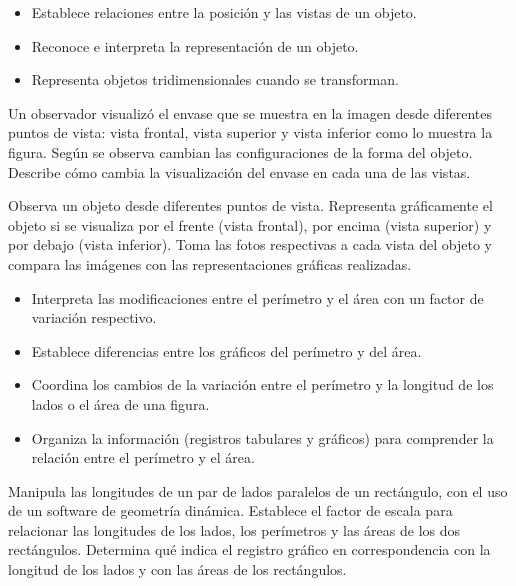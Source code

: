 \evidencias

\begin{itemize}
  \item Establece relaciones entre la posición y las vistas de un objeto.
  \item Reconoce e interpreta la representación de un objeto.
  \item Representa objetos tridimensionales cuando se transforman.
\end{itemize}

\ejemplo

Un observador visualizó el envase que se muestra en la imagen desde diferentes puntos de vista: vista frontal, vista superior y vista inferior como lo muestra la figura. Según se observa cambian las configuraciones de la forma del objeto. Describe cómo cambia la visualización del envase en cada una de las vistas.

Observa un objeto desde diferentes puntos de vista. Representa gráficamente el objeto si se visualiza por el frente (vista frontal), por encima (vista superior) y por debajo (vista inferior). Toma las fotos respectivas a cada vista del objeto y compara las imágenes con las representaciones gráficas realizadas.



\evidencias

\begin{itemize}
  \item Interpreta las modificaciones entre el perímetro y el área con un factor de variación respectivo.
  \item Establece diferencias entre los gráficos del perímetro y del área.
  \item Coordina los cambios de la variación entre el perímetro y la longitud de los lados o el área de una figura.
  \item Organiza la información (registros tabulares y gráficos) para comprender la relación entre el perímetro y el área.
\end{itemize}

\ejemplo

Manipula las longitudes de un par de lados paralelos de un rectángulo, con el uso de un software de geometría dinámica. Establece el factor de escala para relacionar las longitudes de los lados, los perímetros y las áreas de los dos rectángulos. Determina qué indica el registro gráfico en correspondencia con la longitud de los lados y con las áreas de los rectángulos.

